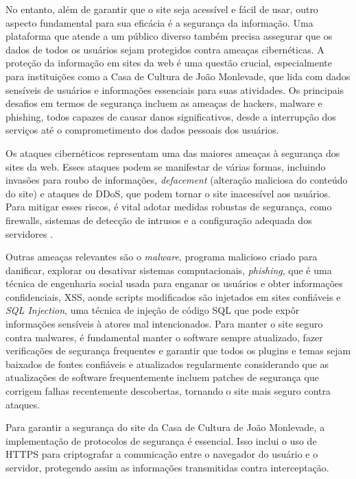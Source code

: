 No entanto, além de garantir que o site seja acessível e fácil de usar, outro aspecto fundamental para sua eficácia é a segurança da informação. Uma plataforma que atende a um público diverso também precisa assegurar que os dados de todos os usuários sejam protegidos contra ameaças cibernéticas. A proteção da informação em sites da web é uma questão crucial, especialmente para instituições como a Casa de Cultura de João Monlevade, que lida com dados sensíveis de usuários e informações essenciais para suas atividades. Os principais desafios em termos de segurança incluem as ameaças de hackers, malware e phishing, todos capazes de causar danos significativos, desde a interrupção dos serviços até o comprometimento dos dados pessoais dos usuários.

Os ataques cibernéticos representam uma das maiores ameaças à segurança dos sites da web. Esses ataques podem se manifestar de várias formas, incluindo invasões para roubo de informações, \textit{defacement} (alteração maliciosa do conteúdo do site) e ataques de \ac{DDoS}, que podem tornar o site inacessível aos usuários. Para mitigar esses riscos, é vital adotar medidas robustas de segurança, como firewalls, sistemas de detecção de intrusos e a configuração adequada dos servidores \cite{li2021comprehensive}.

Outras ameaças relevantes são o \textit{malware}, programa malicioso criado para danificar, explorar ou desativar sistemas computacionais, \textit{phishing}, que é uma técnica de engenharia social usada para enganar os usuários e obter informações confidenciais, \ac{XSS}, aonde scripts modificados são injetados em sites confiáveis e \textit{SQL Injection}, uma técnica de injeção de código \ac{SQL} que pode expôr informações sensíveis à atores mal intencionados. Para manter o site seguro contra malwares, é fundamental manter o software sempre atualizado, fazer verificações de segurança frequentes e garantir que todos os plugins e temas sejam baixados de fontes confiáveis e atualizados regularmente considerando que as atualizações de software frequentemente incluem patches de segurança que corrigem falhas recentemente descobertas, tornando o site mais seguro contra ataques.

Para garantir a segurança do site da Casa de Cultura de João Monlevade, a implementação de protocolos de segurança é essencial. Isso inclui o uso de \ac{HTTPS} para criptografar a comunicação entre o navegador do usuário e o servidor, protegendo assim as informações transmitidas contra interceptação. 

